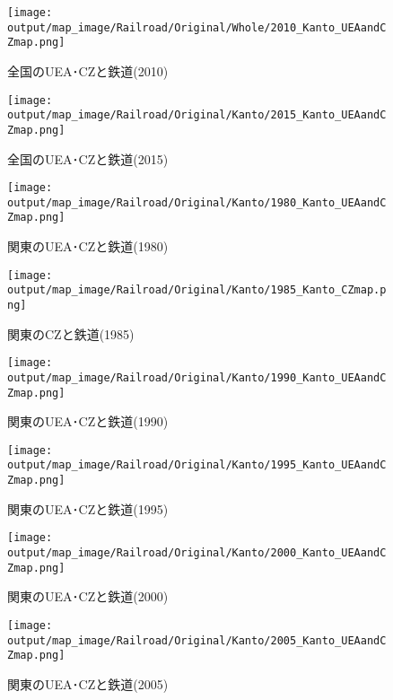 \documentclass{ltjsarticle}
\begin{document}
\begin{figure}[pbth]
  \centering
  \texttt{[image: output/map\_image/Railroad/Original/Whole/2010\_Kanto\_UEAandCZmap.png]}
  \caption{\label{2010:allCZandUEA}全国のUEA･CZと鉄道(2010)}
\end{figure}


\begin{figure}[pbth]
  \centering
  \texttt{[image: output/map\_image/Railroad/Original/Kanto/2015\_Kanto\_UEAandCZmap.png]}
  \caption{\label{2015:allCZandUEA}全国のUEA･CZと鉄道(2015)}
\end{figure}

\begin{figure}[pbth]
  \centering
  \texttt{[image: output/map\_image/Railroad/Original/Kanto/1980\_Kanto\_UEAandCZmap.png]}
  \caption{\label{1980:KanCZandUEA}関東のUEA･CZと鉄道(1980)}
\end{figure}


\begin{figure}[pbth]
  \centering
  \texttt{[image: output/map\_image/Railroad/Original/Kanto/1985\_Kanto\_CZmap.png]}
  \caption{\label{1985:KanCZandUEA}関東のCZと鉄道(1985)}
\end{figure}


\begin{figure}[pbth]
  \centering
  \texttt{[image: output/map\_image/Railroad/Original/Kanto/1990\_Kanto\_UEAandCZmap.png]}
  \caption{\label{1990:KanCZandUEA}関東のUEA･CZと鉄道(1990)}
\end{figure}


\begin{figure}[pbth]
  \centering
  \texttt{[image: output/map\_image/Railroad/Original/Kanto/1995\_Kanto\_UEAandCZmap.png]}
  \caption{\label{1995:KanCZandUEA}関東のUEA･CZと鉄道(1995)}
\end{figure}


\begin{figure}[pbth]
  \centering
  \texttt{[image: output/map\_image/Railroad/Original/Kanto/2000\_Kanto\_UEAandCZmap.png]}
  \caption{\label{2000:KanCZandUEA}関東のUEA･CZと鉄道(2000)}
\end{figure}


\begin{figure}[pbth]
  \centering
  \texttt{[image: output/map\_image/Railroad/Original/Kanto/2005\_Kanto\_UEAandCZmap.png]}
  \caption{\label{2005:KanCZandUEA}関東のUEA･CZと鉄道(2005)}
\end{figure}
\end{document}
